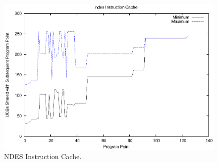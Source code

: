 \begin{figure}[h!]
\begin{center}
\includegraphics[width=\linewidth]{eps/ndes-icache.eps}
\caption{NDES Instruction Cache.}
\label{fig:ndes_instruction_cache}
\end{center}
\end{figure}
% 